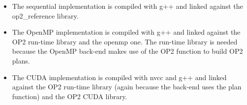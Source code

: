 \documentclass[a4paper]{article}
\begin{document}
\begin{itemize}

\item The sequential implementation is compiled with g++ and linked
  against the op2\_reference library.

\item The OpenMP implementation is compiled with g++ and linked
  against the OP2 run-time library and the openmp one. The run-time
  library is needed because the OpenMP back-end makes use of the OP2
  function to build OP2 plans.

\item The CUDA implementation is compiled with nvcc and g++ and linked
  against the OP2 run-time library (again because the back-end uses
  the plan function) and the OP2 CUDA library.

\end{itemize}
\end{document}
